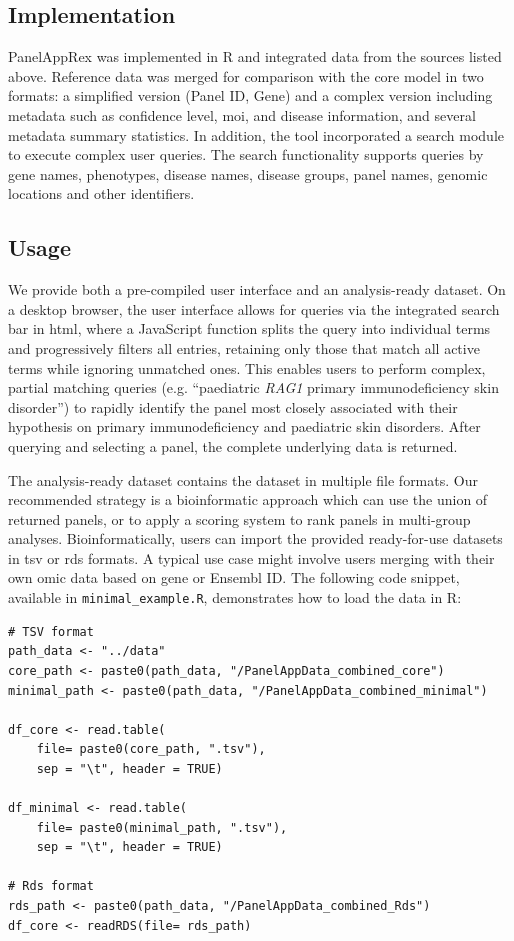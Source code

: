 \subsection{Implementation}
\noindent
PanelAppRex was implemented in R and integrated data from the sources listed above.
Reference data was merged for comparison with the core model in two formats: a simplified version (Panel ID, Gene) and a complex version including metadata such as confidence level, \ac{moi}, and disease information, and several metadata summary statistics. In addition, the tool incorporated a search module to execute complex user queries. The search functionality supports queries by gene names, phenotypes, disease names, disease groups, panel names, genomic locations and other identifiers. 

\subsection{Usage}
\noindent
We provide both a pre-compiled user interface and an analysis-ready dataset.
On a desktop browser, the user interface allows for queries via the integrated search bar in \ac{html}, where a JavaScript function splits the query into individual terms and progressively filters all entries, retaining only those that match all active terms while ignoring unmatched ones. This enables users to perform complex, partial matching queries (e.g. ``paediatric \textit{RAG1} primary immunodeficiency skin disorder'') to rapidly identify the panel most closely associated with their hypothesis on primary immunodeficiency and paediatric skin disorders.
After querying and selecting a panel, the complete underlying data is returned.

The analysis-ready dataset contains the dataset in multiple file formats.
Our recommended strategy is a bioinformatic approach which can use the union of returned panels, or to apply a scoring system to rank panels in multi-group analyses.
Bioinformatically, users can import the provided ready-for-use datasets in \ac{tsv} or \ac{rds} formats.
A typical use case might involve users merging with their own omic data based on gene or Ensembl ID.
The following code snippet, available in \texttt{minimal\_example.R}, demonstrates how to load the data in R:
\begin{verbatim}
# TSV format
path_data <- "../data"
core_path <- paste0(path_data, "/PanelAppData_combined_core")
minimal_path <- paste0(path_data, "/PanelAppData_combined_minimal")

df_core <- read.table(
    file= paste0(core_path, ".tsv"), 
    sep = "\t", header = TRUE)

df_minimal <- read.table(
    file= paste0(minimal_path, ".tsv"), 
    sep = "\t", header = TRUE)

# Rds format
rds_path <- paste0(path_data, "/PanelAppData_combined_Rds")
df_core <- readRDS(file= rds_path)
\end{verbatim}

